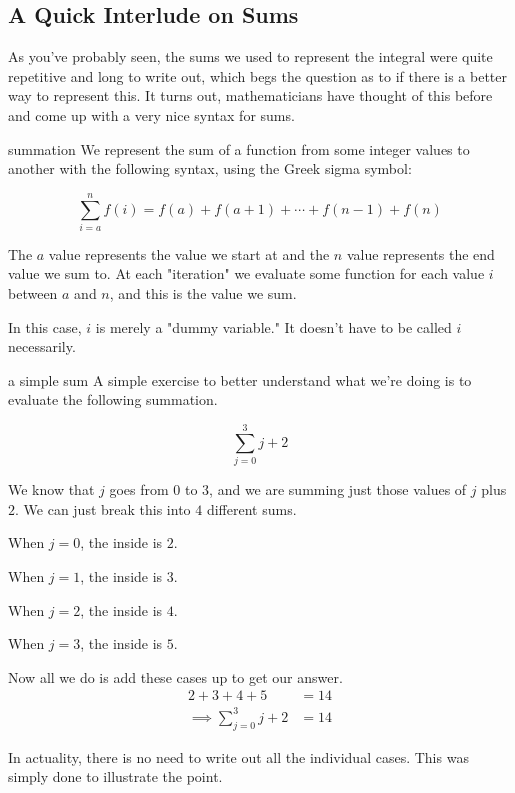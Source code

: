 \subsection{A Quick Interlude on Sums}

As you've probably seen, the sums we used to represent the integral were quite repetitive and long to write out, which begs the question as to if there is a better way to represent this. It turns out, mathematicians have thought of this before and come up with a very nice syntax for sums.

\begin{notation}{summation}
    We represent the sum of a function from some integer values to another with the following syntax, using the Greek sigma symbol:

    \[
        \sum_{i = a}^{n} f \left( i \right) = f \left( a \right) + f \left( a + 1 \right) + \cdots + f \left( n - 1 \right) + f \left( n \right)
    \]

    The \( a \) value represents the value we start at and the \( n \) value represents the end value we sum to. At each "iteration" we evaluate some function for each value \( i \) between \( a \) and \( n \), and this is the value we sum.

    In this case, \( i \) is merely a "dummy variable." It doesn't have to be called \( i \) necessarily.
\end{notation}

\begin{example}{a simple sum}
    A simple exercise to better understand what we're doing is to evaluate the following summation.

    \[
        \sum_{j = 0}^{3} j + 2
    \]

    We know that \( j \) goes from \( 0 \) to \( 3 \), and we are summing just those values of \( j \) plus \( 2 \). We can just break this into \( 4 \) different sums.

    \begin{center}
    When \( j = 0 \), the inside is \( 2 \).

    When \( j = 1 \), the inside is \( 3 \).

    When \( j = 2 \), the inside is \( 4 \).

    When \( j = 3 \), the inside is \( 5 \).
    \end{center}

    Now all we do is add these cases up to get our answer.
    \begin{align*}
        2 + 3 + 4 + 5 &= 14 \\
        \implies \sum_{j = 0}^{3} j + 2 &= 14
    \end{align*}

    In actuality, there is no need to write out all the individual cases. This was simply done to illustrate the point.
\end{example}


